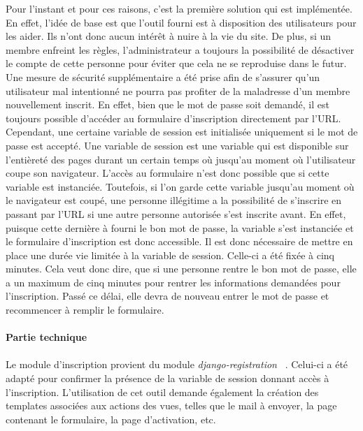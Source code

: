 \documentclass[12pt, a4paper, oneside]{article}
\begin{document}
    \indent Pour l'instant et pour ces raisons, c'est la première solution qui est implémentée. En effet, l'idée de base est que l'outil fourni est à disposition des utilisateurs pour les aider. Ils n'ont donc aucun intérêt à nuire à la vie du site. De plus, si un membre enfreint les règles, l'administrateur a toujours la possibilité de désactiver le compte de cette personne pour éviter que cela ne se reproduise dans le futur. Une mesure de sécurité supplémentaire a été prise afin de s'assurer qu'un utilisateur mal intentionné ne pourra pas profiter de la maladresse d'un membre nouvellement inscrit. En effet, bien que le mot de passe soit demandé, il est toujours possible d'accéder au formulaire d'inscription directement par l'URL. Cependant, une certaine variable de session est initialisée uniquement si le mot de passe est accepté. Une variable de session est une variable qui est disponible sur l'entièreté des pages durant un certain temps où jusqu'au moment où l'utilisateur coupe son navigateur. L'accès au formulaire n'est donc possible que si cette variable est instanciée. Toutefois, si l'on garde cette variable jusqu'au moment où le navigateur est coupé, une personne illégitime a la possibilité de s'inscrire en passant par l'URL si une autre personne autorisée s'est inscrite avant. En effet, puisque cette dernière à fourni le bon mot de passe, la variable s'est instanciée et le formulaire d'inscription est donc accessible. Il est donc nécessaire de mettre en place une durée vie limitée à la variable de session. Celle-ci a été fixée à cinq minutes. Cela veut donc dire, que si une personne rentre le bon mot de passe, elle a un maximum de cinq minutes pour rentrer les informations demandées pour l'inscription. Passé ce délai, elle devra de nouveau entrer le mot de passe et recommencer à remplir le formulaire.\\\\
\textbf{Partie technique}\\\\
    \indent Le module d'inscription provient du module \textit{django-registration} ~\cite{django-registration}. Celui-ci a été adapté pour confirmer la présence de la variable de session donnant accès à l'inscription. L'utilisation de cet outil demande également la création des templates associées aux actions des vues, telles que le mail à envoyer, la page contenant le formulaire, la page d'activation, etc.\\
\end{document}
